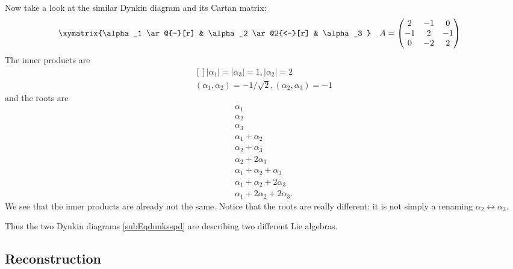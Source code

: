Now take a look at the similar Dynkin diagram and its Cartan matrix:
\begin{subequations}
	\begin{align}
		\xymatrix{%
		\alpha_1 \ar@{-}[r] & \alpha_2 \ar@2{<-}[r] & \alpha_3
		}                   &
		                    & A                     & =\begin{pmatrix}
			                                               2  & -1 & 0  \\
			                                               -1 & 2  & -1 \\
			                                               0  & -2 & 2
		                                               \end{pmatrix}
	\end{align}
\end{subequations}
The inner products are
\begin{equation}
	\begin{aligned}[]
		| \alpha_1 |=|\alpha_3|=1, | \alpha_2 |=2 \\
		(\alpha_1,\alpha_2)=-1/\sqrt{2},(\alpha_2,\alpha_3)=-1
	\end{aligned}
\end{equation}
and the roots are
\begin{subequations}
	\begin{align}
		\alpha_1                    \\
		\alpha_2                    \\
		\alpha_3                    \\
		\alpha_1+\alpha_2           \\
		\alpha_2+\alpha_3           \\
		\alpha_2+2\alpha_3          \\
		\alpha_1+\alpha_2+\alpha_3  \\
		\alpha_1+\alpha_2+2\alpha_3 \\
		\alpha_1+2\alpha_2+2\alpha_3.
	\end{align}
\end{subequations}
We see that the inner products are already not the same. Notice that the roots are really different: it is not simply a renaming \( \alpha_2\leftrightarrow \alpha_3\).

Thus the two Dynkin diagrams \eqref{subEqdunksspd} are describing two different Lie algebras.


\subsection{Reconstruction}

